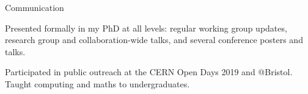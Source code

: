 \begin{cventries}
    \cventry
    {}
    {Communication}
    {}
    {}
    {
      \begin{cvitems}
        \item {Presented formally in my PhD at all levels: regular working group updates, research group and collaboration-wide talks, and several conference posters and talks.}
        \item {Participated in public outreach at the CERN Open Days 2019 and @Bristol. Taught computing and maths to undergraduates.}
        \end{cvitems}
    }

\end{cventries}
